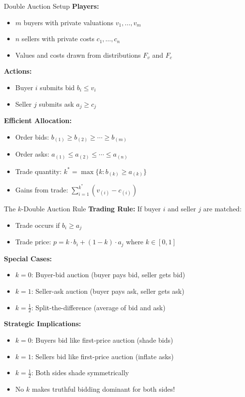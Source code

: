 \documentclass[xcolor={x11names}, aspectratio=169 ]{beamer}
\begin{document}
\begin{frame}{Double Auction Setup}
\textbf{Players:}
\begin{itemize}
  \item $m$ buyers with private valuations $v_1, \ldots, v_m$
  \item $n$ sellers with private costs $c_1, \ldots, c_n$
  \item Values and costs drawn from distributions $F_v$ and $F_c$
\end{itemize}

\textbf{Actions:}
\begin{itemize}
  \item Buyer $i$ submits bid $b_i \leq v_i$
  \item Seller $j$ submits ask $a_j \geq c_j$
\end{itemize}

\textbf{Efficient Allocation:}
\begin{itemize}
  \item Order bids: $b_{(1)} \geq b_{(2)} \geq \cdots \geq b_{(m)}$
  \item Order asks: $a_{(1)} \leq a_{(2)} \leq \cdots \leq a_{(n)}$
  \item Trade quantity: $k^* = \max\{k : b_{(k)} \geq a_{(k)}\}$
  \item Gains from trade: $\sum_{i=1}^{k^*}(v_{(i)} - c_{(i)})$
\end{itemize}
\end{frame}

\begin{frame}{The $k$-Double Auction Rule}
\textbf{Trading Rule:} If buyer $i$ and seller $j$ are matched:
\begin{itemize}
  \item Trade occurs if $b_i \geq a_j$
  \item Trade price: $p = k \cdot b_i + (1-k) \cdot a_j$ where $k \in [0,1]$
\end{itemize}

\textbf{Special Cases:}
\begin{itemize}
  \item $k=0$: Buyer-bid auction (buyer pays bid, seller gets bid)
  \item $k=1$: Seller-ask auction (buyer pays ask, seller gets ask)
  \item $k=\frac{1}{2}$: Split-the-difference (average of bid and ask)
\end{itemize}

\textbf{Strategic Implications:}
\begin{itemize}
  \item $k=0$: Buyers bid like first-price auction (shade bids)
  \item $k=1$: Sellers bid like first-price auction (inflate asks)
  \item $k=\frac{1}{2}$: Both sides shade symmetrically
  \item No $k$ makes truthful bidding dominant for both sides!
\end{itemize}
\end{frame}
\end{document}
